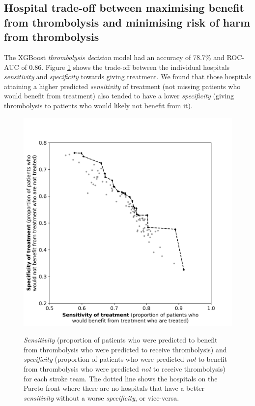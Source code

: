 \subsection{Hospital trade-off between maximising benefit from thrombolysis and minimising risk of harm from thrombolysis}

The XGBoost \textit{thrombolysis decision} model had an accuracy of 78.7\% and ROC-AUC of 0.86. Figure \ref{fig:hosp_shap_scatter} shows the trade-off between the individual hospitals \textit{sensitivity} and \textit{specificity} towards giving treatment. We found that those hospitals attaining a higher predicted \textit{sensitivity} of treatment (not missing patients who would benefit from treatment) also tended to have a lower \textit{specificity} (giving thrombolysis to patients who would likely not benefit from it).


\begin{figure}
    \centering
    {\includegraphics[width=0.65\linewidth]{./images/p4_spec_sens}} 
    \caption{\textit{Sensitivity} (proportion of patients who were predicted to benefit from thrombolysis who were predicted to receive thrombolysis) and \textit{specificity} (proportion of patients who were predicted \textit{not} to benefit from thrombolysis who were predicted \textit{not} to receive thrombolysis) for each stroke team. The dotted line shows the hospitals on the Pareto front where there are no hospitals that have a better \textit{sensitivity} without a worse \textit{specificity}, or vice-versa.}
    \label{fig:hosp_shap_scatter}
\end{figure}


